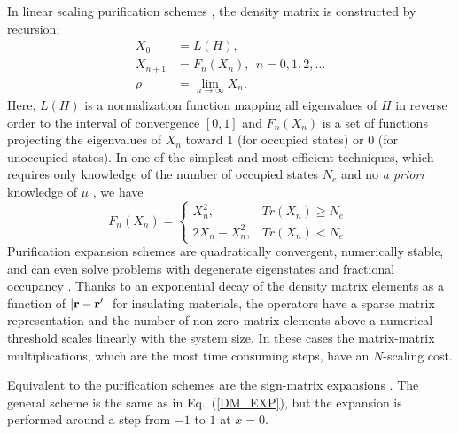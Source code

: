 \documentclass[prl,aps,twocolumn,showpacs,twocolumngrid,superbib]{revtex4}
\begin{document}
In linear scaling purification schemes 
\cite{McWeeny60,Clinton69,Palser98,Holas01,NiklassonWLT,NiklassonSP2,NiklassonSP4}, 
the density matrix is constructed by recursion;
\begin{equation}\label{DM_EXP} \begin{array}{ll}
X_0     & = L(H), \\
X_{n+1} & = F_n(X_n), ~~ n = 0,1,2, \ldots\\
\rho    & = \lim_{n \rightarrow \infty} X_n. \end{array}
\end{equation}
Here, $L(H)$ is a normalization function mapping all eigenvalues of $H$
in reverse order to the interval of convergence $[0,1]$ and $F_{n}(X_n)$ 
is a set of functions projecting the eigenvalues of $X_n$
toward  1 (for occupied states) or 0 (for unoccupied states). In one of 
the simplest and most efficient techniques, which requires only 
knowledge of the number of occupied states $N_e$ and no {\em a priori} 
knowledge of $\mu$ \cite{NiklassonSP2}, we have 
\begin{equation} \label{SP2}
F_{n}(X_n) = 
\left\{\begin{array}{ll}
X_n^2, &  Tr(X_n) \geq N_e \\
2X_n - X_n^2, & Tr(X_n) < N_e.
\end{array} \right.
\end{equation}
Purification expansion schemes are quadratically convergent,
numerically stable, and can even solve problems with degenerate
eigenstates and fractional occupancy \cite{NiklassonSP4}. Thanks to an 
exponential decay of the density matrix elements as a function of $|{\bf r-r'}|$ for 
insulating materials, the operators have a sparse matrix 
representation and the number of non-zero matrix elements above a numerical threshold
scales linearly with the system size.  In these cases the matrix-matrix multiplications, 
which are the most time consuming steps, have an $N$-scaling cost.

Equivalent to the purification
schemes are the sign-matrix expansions \cite{Kenney91,Beylkin99,Karoly}.
The general scheme is the same as in Eq.\ (\ref{DM_EXP}), but
the expansion is performed around a step from $-1$ to $1$ at $x=0$.
\end{document}
